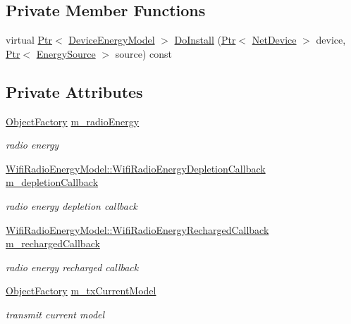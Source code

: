\subsection*{Private Member Functions}
\begin{DoxyCompactItemize}
\item 
virtual \hyperlink{classns3_1_1Ptr}{Ptr}$<$ \hyperlink{classns3_1_1DeviceEnergyModel}{Device\+Energy\+Model} $>$ \hyperlink{classns3_1_1WifiRadioEnergyModelHelper_ae366598debcc6f6df52928cf6adc573e}{Do\+Install} (\hyperlink{classns3_1_1Ptr}{Ptr}$<$ \hyperlink{classns3_1_1NetDevice}{Net\+Device} $>$ device, \hyperlink{classns3_1_1Ptr}{Ptr}$<$ \hyperlink{classns3_1_1EnergySource}{Energy\+Source} $>$ source) const 
\end{DoxyCompactItemize}
\subsection*{Private Attributes}
\begin{DoxyCompactItemize}
\item 
\hyperlink{classns3_1_1ObjectFactory}{Object\+Factory} \hyperlink{classns3_1_1WifiRadioEnergyModelHelper_aa69c0d9a84c1b1789df311f45eb29966}{m\+\_\+radio\+Energy}
\begin{DoxyCompactList}\small\item\em radio energy \end{DoxyCompactList}\item 
\hyperlink{classns3_1_1WifiRadioEnergyModel_afdab2f5c9b565fd1ef7cf3fddd62ffab}{Wifi\+Radio\+Energy\+Model\+::\+Wifi\+Radio\+Energy\+Depletion\+Callback} \hyperlink{classns3_1_1WifiRadioEnergyModelHelper_a8a6969b2f4b0e568330284b8ea29bb35}{m\+\_\+depletion\+Callback}
\begin{DoxyCompactList}\small\item\em radio energy depletion callback \end{DoxyCompactList}\item 
\hyperlink{classns3_1_1WifiRadioEnergyModel_a1b594cba69350dd9bb93fc525f6124c4}{Wifi\+Radio\+Energy\+Model\+::\+Wifi\+Radio\+Energy\+Recharged\+Callback} \hyperlink{classns3_1_1WifiRadioEnergyModelHelper_a7ef62c4c3b8605a1d9b1d828a3beef59}{m\+\_\+recharged\+Callback}
\begin{DoxyCompactList}\small\item\em radio energy recharged callback \end{DoxyCompactList}\item 
\hyperlink{classns3_1_1ObjectFactory}{Object\+Factory} \hyperlink{classns3_1_1WifiRadioEnergyModelHelper_adbd381edb03c4b897d94090410c378b6}{m\+\_\+tx\+Current\+Model}
\begin{DoxyCompactList}\small\item\em transmit current model \end{DoxyCompactList}\end{DoxyCompactItemize}


